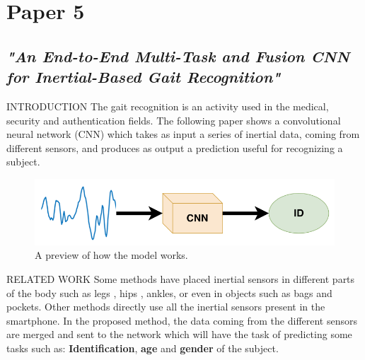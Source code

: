 \section{Paper 5}
\subsection{\emph{"An End-to-End Multi-Task and Fusion CNN for Inertial-Based Gait Recognition"}}

\begin{frame}{INTRODUCTION}
    The gait recognition is an activity used in the medical, security and 
    authentication fields. The following paper shows a convolutional neural 
    network (CNN) which takes as input a series of inertial data, coming 
    from different sensors, and produces as output a prediction useful for 
    recognizing a subject.
    \begin{figure}[htbp]
        \centering
        \includegraphics[width = 0.6 \linewidth]{images/paper5/usecase.png}
        \centering
        \caption{A preview of how the model works.}
        \label{fig:preview}
    \end{figure}
\end{frame}

\begin{frame}{RELATED WORK}
    Some methods have placed inertial sensors in different parts of the body 
    such as legs , hips , ankles, or even in objects such as bags and 
    pockets. Other methods  directly use all the inertial sensors present in 
    the smartphone. In the proposed method, the data coming from the 
    different sensors are merged and sent to the network which will have the 
    task of predicting some tasks such as: {\bfseries{Identification}}, {\bfseries{age}} and {\bfseries{gender}} of 
    the subject.
\end{frame}

